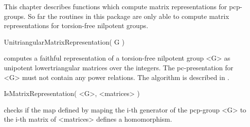 

This chapter describes functions which compute matrix representations
for pcp-groups.  So far the routines in this package are only able to
compute matrix representations for torsion-free nilpotent groups.

\>UnitriangularMatrixRepresentation( G )

computes a faithful representation of a torsion-free nilpotent group
<G> as unipotent lowertriangular matrices over the integers.  The
pc-presentation for <G> must not contain any power relations.  The
algorithm is described in \cite{dGN02}.

\>IsMatrixRepresentation( <G>, <matrices> )

checks if the map defined by maping the i-th generator of the
pcp-group <G> to the i-th matrix of <matrices> defines a homomorphism.

